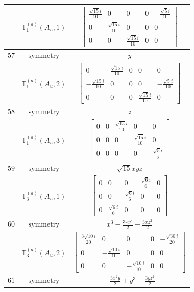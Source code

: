 \documentclass[fleqn,8pt,landscape]{jsarticle}
\begin{document}
\begin{longtable}{ccc}
$  $ & $ \mathbb{T}_{1}^{(a)}(A_{u},1) $ & $ \begin{bmatrix} \frac{\sqrt{15} i}{10} & 0 & 0 & 0 & - \frac{\sqrt{5} i}{10} \\ 0 & \frac{\sqrt{15} i}{10} & 0 & 0 & 0 \\ 0 & 0 & \frac{\sqrt{15} i}{10} & 0 & 0 \end{bmatrix} $ \\ \hline
$ 57 $ & $ \text{symmetry} $ & $ y $ \\
$  $ & $ \mathbb{T}_{1}^{(a)}(A_{u},2) $ & $ \begin{bmatrix} 0 & \frac{\sqrt{15} i}{10} & 0 & 0 & 0 \\ - \frac{\sqrt{15} i}{10} & 0 & 0 & 0 & - \frac{\sqrt{5} i}{10} \\ 0 & 0 & 0 & \frac{\sqrt{15} i}{10} & 0 \end{bmatrix} $ \\ \hline
$ 58 $ & $ \text{symmetry} $ & $ z $ \\
$  $ & $ \mathbb{T}_{1}^{(a)}(A_{u},3) $ & $ \begin{bmatrix} 0 & 0 & \frac{\sqrt{15} i}{10} & 0 & 0 \\ 0 & 0 & 0 & \frac{\sqrt{15} i}{10} & 0 \\ 0 & 0 & 0 & 0 & \frac{\sqrt{5} i}{5} \end{bmatrix} $ \\ \hline
$ 59 $ & $ \text{symmetry} $ & $ \sqrt{15} x y z $ \\
$  $ & $ \mathbb{T}_{3}^{(a)}(A_{u},1) $ & $ \begin{bmatrix} 0 & 0 & 0 & \frac{\sqrt{6} i}{6} & 0 \\ 0 & 0 & \frac{\sqrt{6} i}{6} & 0 & 0 \\ 0 & \frac{\sqrt{6} i}{6} & 0 & 0 & 0 \end{bmatrix} $ \\ \hline
$ 60 $ & $ \text{symmetry} $ & $ x^{3} - \frac{3 x y^{2}}{2} - \frac{3 x z^{2}}{2} $ \\
$  $ & $ \mathbb{T}_{3}^{(a)}(A_{u},2) $ & $ \begin{bmatrix} \frac{3 \sqrt{10} i}{20} & 0 & 0 & 0 & - \frac{\sqrt{30} i}{20} \\ 0 & - \frac{\sqrt{10} i}{10} & 0 & 0 & 0 \\ 0 & 0 & - \frac{\sqrt{10} i}{10} & 0 & 0 \end{bmatrix} $ \\ \hline
$ 61 $ & $ \text{symmetry} $ & $ - \frac{3 x^{2} y}{2} + y^{3} - \frac{3 y z^{2}}{2} $ \\

\end{longtable}
\end{document}
